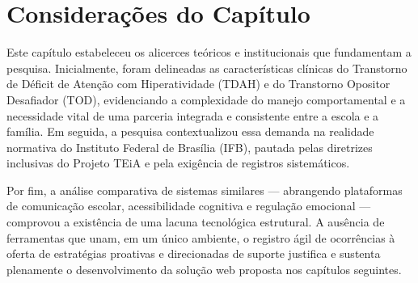 \vspace{0.3cm}
\section{Considerações do Capítulo}

Este capítulo estabeleceu os alicerces teóricos e institucionais que fundamentam a pesquisa. Inicialmente, foram delineadas as características clínicas do Transtorno de Déficit de Atenção com Hiperatividade (TDAH) e do Transtorno Opositor Desafiador (TOD), evidenciando a complexidade do manejo comportamental e a necessidade vital de uma parceria integrada e consistente entre a escola e a família. Em seguida, a pesquisa contextualizou essa demanda na realidade normativa do Instituto Federal de Brasília (IFB), pautada pelas diretrizes inclusivas do Projeto TEiA e pela exigência de registros sistemáticos.

Por fim, a análise comparativa de sistemas similares — abrangendo plataformas de comunicação escolar, acessibilidade cognitiva e regulação emocional — comprovou a existência de uma lacuna tecnológica estrutural. A ausência de ferramentas que unam, em um único ambiente, o registro ágil de ocorrências à oferta de estratégias proativas e direcionadas de suporte justifica e sustenta plenamente o desenvolvimento da solução web proposta nos capítulos seguintes.
